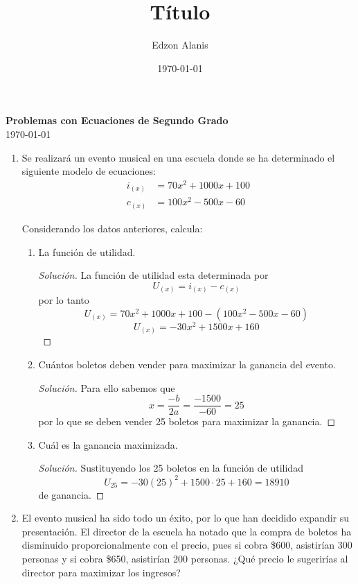 \documentclass[12pt]{article}
\title{Título}
\author{Edzon Alanis}
\date{\today}
\newenvironment{solution}{\begin{proof}[Solución]}{\end{proof}}
\begin{document}

\begin{center}
    \textbf{\large Problemas con Ecuaciones de Segundo Grado} \\[0.4cm]
    \today
\end{center}

\vspace*{5mm}

\begin{enumerate}
    \item Se realizará un evento musical en una escuela donde se ha determinado el
    siguiente modelo de ecuaciones: \begin{align*}
        i_{(x)} &= 70x^2+1000x+100 \\
        c_{(x)} &= 100x^2-500x-60
    \end{align*}

    Considerando los datos anteriores, calcula: \begin{enumerate}
        \item La función de utilidad. \begin{solution}
            La función de utilidad esta determinada por \[U_{(x)} = i_{(x)}- c_{(x)}\] por lo tanto
            \[U_{(x)} = 70x^2+1000x+100 - (100x^2-500x-60)\] \[U_{(x)} = -30x^2+1500x+160\]
        \end{solution}
        \item Cuántos boletos deben vender para maximizar la ganancia del evento. \begin{solution}
            Para ello sabemos que \[x = \frac{-b}{2a} =  \frac{-1500}{-60} = 25\] por lo que se deben vender 25 boletos para maximizar la ganancia.
        \end{solution}
        \item Cuál es la ganancia maximizada. \begin{solution}
            Sustituyendo los 25 boletos en la función de utilidad \[U_{25} = -30(25)^2+1500\cdot 25+160 = 18910\] de ganancia.
        \end{solution}
    \end{enumerate}

    \item El evento musical ha sido todo un éxito, por lo que han decidido expandir su
    presentación. El director de la escuela ha notado que la compra de boletos ha
    disminuido proporcionalmente con el precio, pues si cobra \$600, asistirían 300
    personas y si cobra \$650, asistirían 200 personas. ¿Qué precio le sugerirías al
    director para maximizar los ingresos?


\end{enumerate}
\end{document}
